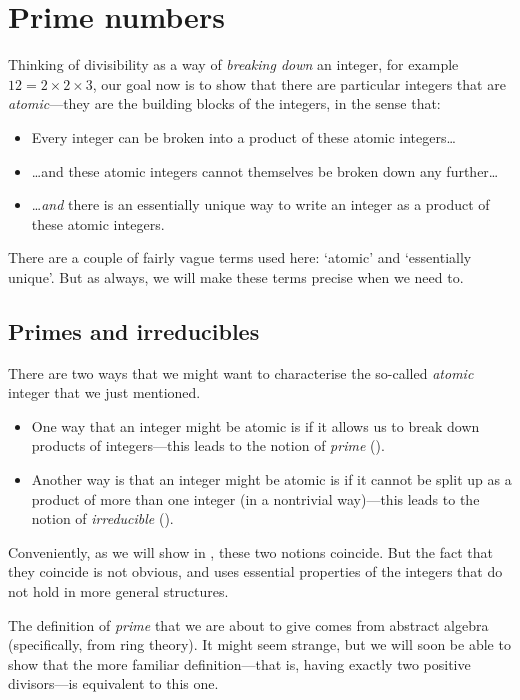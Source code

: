 \section{Prime numbers}

Thinking of divisibility as a way of \textit{breaking down} an integer, for example $12 = 2 \times 2 \times 3$, our goal now is to show that there are particular integers that are \textit{atomic}---they are the building blocks of the integers, in the sense that:
\begin{itemize}
\item Every integer can be broken into a product of these atomic integers\dots{}
\item \dots{}and these atomic integers cannot themselves be broken down any further\dots{}
\item \dots{}\textit{and} there is an essentially unique way to write an integer as a product of these atomic integers.
\end{itemize}

There are a couple of fairly vague terms used here: `atomic' and `essentially unique'. But as always, we will make these terms precise when we need to.

\subsection*{Primes and irreducibles}

There are two ways that we might want to characterise the so-called \textit{atomic} integer that we just mentioned.
\begin{itemize}
\item One way that an integer might be atomic is if it allows us to break down products of integers---this leads to the notion of \textit{prime} ().
\item Another way is that an integer might be atomic is if it cannot be split up as a product of more than one integer (in a nontrivial way)---this leads to the notion of \textit{irreducible} ().
\end{itemize}
Conveniently, as we will show in , these two notions coincide. But the fact that they coincide is not obvious, and uses essential properties of the integers that do not hold in more general structures.

The definition of \textit{prime} that we are about to give comes from abstract algebra (specifically, from ring theory). It might seem strange, but we will soon be able to show that the more familiar definition---that is, having exactly two positive divisors---is equivalent to this one.

